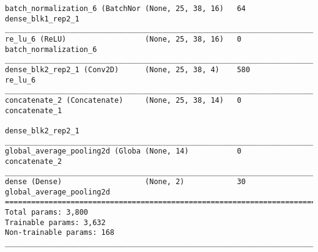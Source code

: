 \begin{verbatim}
batch_normalization_6 (BatchNor (None, 25, 38, 16)   64          dense_blk1_rep2_1          
__________________________________________________________________________________________
re_lu_6 (ReLU)                  (None, 25, 38, 16)   0           batch_normalization_6      
__________________________________________________________________________________________
dense_blk2_rep2_1 (Conv2D)      (None, 25, 38, 4)    580         re_lu_6                    
__________________________________________________________________________________________
concatenate_2 (Concatenate)     (None, 25, 38, 14)   0           concatenate_1              
                                                                 dense_blk2_rep2_1    
__________________________________________________________________________________________
global_average_pooling2d (Globa (None, 14)           0           concatenate_2              
__________________________________________________________________________________________
dense (Dense)                   (None, 2)            30          global_average_pooling2d   
==========================================================================================
Total params: 3,800
Trainable params: 3,632
Non-trainable params: 168
__________________________________________________________________________________________
\end{verbatim}
\clearpage
